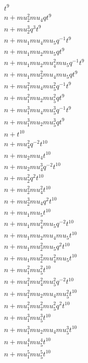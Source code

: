 \begin{align*}
t^{9} \\n  + mu_2^{2} mu_4 q t^{9} \\n  + mu_2^{3} q^{3} t^{9} \\n  + mu_1 mu_4 mu_5 q^{-1} t^{9} \\n  + mu_1 mu_2 mu_5 q t^{9} \\n  + mu_1 mu_2 mu_4^{2} mu_5 q^{-1} t^{9} \\n  + mu_1 mu_2^{2} mu_4 mu_5 q t^{9} \\n  + mu_1^{2} mu_4 mu_5^{2} q^{-1} t^{9} \\n  + mu_1^{2} mu_2 mu_5^{2} q t^{9} \\n  + mu_1^{3} mu_4 mu_5^{3} q^{-1} t^{9} \\n  + mu_1^{3} mu_2 mu_5^{3} q t^{9} \\n  + t^{10} \\n  + mu_4^{2} q^{-2} t^{10} \\n  + mu_2 mu_4 t^{10} \\n  + mu_2 mu_4^{3} q^{-2} t^{10} \\n  + mu_2^{2} q^{2} t^{10} \\n  + mu_2^{2} mu_4^{2} t^{10} \\n  + mu_2^{3} mu_4 q^{2} t^{10} \\n  + mu_1 mu_5 t^{10} \\n  + mu_1 mu_4^{2} mu_5 q^{-2} t^{10} \\n  + mu_1 mu_2 mu_4 mu_5 t^{10} \\n  + mu_1 mu_2^{2} mu_5 q^{2} t^{10} \\n  + mu_1 mu_2^{2} mu_4^{2} mu_5 t^{10} \\n  + mu_1^{2} mu_5^{2} t^{10} \\n  + mu_1^{2} mu_4^{2} mu_5^{2} q^{-2} t^{10} \\n  + mu_1^{2} mu_2 mu_4 mu_5^{2} t^{10} \\n  + mu_1^{2} mu_2^{2} mu_5^{2} q^{2} t^{10} \\n  + mu_1^{3} mu_5^{3} t^{10} \\n  + mu_1^{3} mu_2 mu_4 mu_5^{3} t^{10} \\n  + mu_1^{4} mu_5^{4} t^{10} \\n  + mu_1^{5} mu_5^{5} t^{10}
\end{align*}
